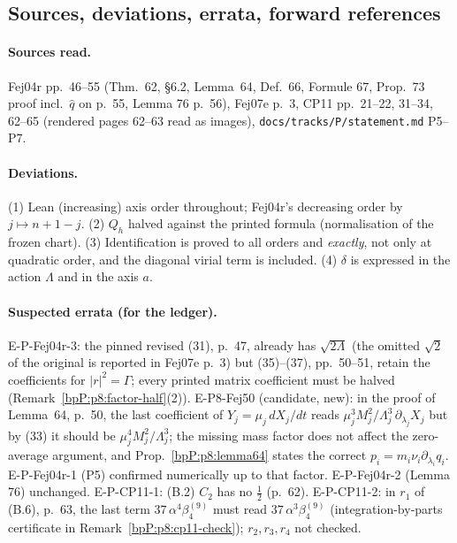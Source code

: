 \subsection{Sources, deviations, errata, forward references}\label{bpP:p8:notes}

\paragraph{Sources read.} Fej04r pp.~46--55 (Thm.~62, \S6.2, Lemma~64, Def.~66, Formule 67, Prop.~73 proof incl.\ $\hat q$ on p.~55, Lemma 76 p.~56), Fej07e p.~3, CP11 pp.~21--22, 31--34, 62--65 (rendered pages 62--63 read as images), \texttt{docs/tracks/P/statement.md} P5--P7.

\paragraph{Deviations.} (1) Lean (increasing) axis order throughout; Fej04r's decreasing order by $j\mapsto n+1-j$. (2) $Q_h$ halved against the printed formula (normalisation of the frozen chart). (3) Identification is proved to all orders and \emph{exactly}, not only at quadratic order, and the diagonal virial term is included. (4) $\delta$ is expressed in the action $\Lambda$ and in the axis $a$.

\paragraph{Suspected errata (for the ledger).} E-P-Fej04r-3: the pinned revised (31), p.~47, already has $\sqrt{2\Lambda}$ (the omitted $\sqrt2$ of the original is reported in Fej07e p.~3) but (35)--(37), pp.~50--51, retain the coefficients for $|r|^2=\Gamma$; every printed matrix coefficient must be halved (Remark~\ref{bpP:p8:factor-half}(2)). E-P8-Fej50 (candidate, new): in the proof of Lemma~64, p.~50, the last coefficient of $Y_j=\mu_j\,dX_j/dt$ reads $\mu_j^3M_j^2/\Lambda_j^3\,\partial_{\lambda_j}X_j$ but by (33) it should be $\mu_j^4M_j^2/\Lambda_j^3$; the missing mass factor does not affect the zero-average argument, and Prop.~\ref{bpP:p8:lemma64} states the correct $p_i=m_i\nu_i\partial_{\lambda_i}q_i$. E-P-Fej04r-1 (P5) confirmed numerically up to that factor. E-P-Fej04r-2 (Lemma 76) unchanged. E-P-CP11-1: (B.2) $C_2$ has no $\tfrac12$ (p.~62). E-P-CP11-2: in $r_1$ of (B.6), p.~63, the last term $37\,\alpha^4\beta_4^{(9)}$ must read $37\,\alpha^3\beta_4^{(9)}$ (integration-by-parts certificate in Remark~\ref{bpP:p8:cp11-check}); $r_2,r_3,r_4$ not checked.

